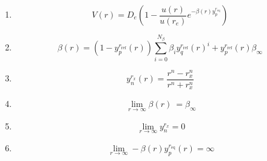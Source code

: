 \documentclass{article}
\begin{document}
\begin{enumerate}

\item \begin{equation} V(r)=D_e(1-\frac{u(r)}{u(r_e)}e^{-\beta(r)y_p^{r_\textrm{eq}}}) \end{equation}

\item \begin{equation} \beta(r)=(1-y_p^{r_\textrm{{ref}}}(r))\sum_{i=0}^{N_\beta}\beta_iy_q^{r_\textrm{{ref}}}(r)^i+y_p^{r_\textrm{{ref}}}(r)\beta_\infty\end{equation}

\item \begin{equation} y_n^{r_x}(r)=\frac{r^n-r_x^n}{r^n+r_x^n} \end{equation}

\item \begin{equation} \ \lim_{r\to\infty} \beta(r) \ = \beta_\infty \end{equation}

\item \begin{equation} \ \lim_{r\to\infty} y_n^{r_x} = 0 \end{equation}

\item \begin{equation} \ \lim_{r\to\infty} -\beta(r)y_p^{r_\textrm{eq}}(r) = \infty \end{equation}



\end{enumerate}
\end{document}
